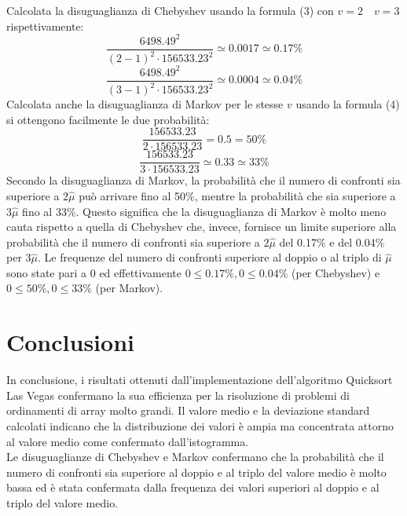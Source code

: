 \documentclass[12pt]{article}
\begin{document}
Calcolata la disuguaglianza di Chebyshev usando la formula (3)
con $v=2 \quad v=3$ rispettivamente:
\begin{equation*}
    \frac{6498.49^{2}}{(2-1)^{2}\cdot 156533.23^{2}} \simeq 0.0017 
    \simeq 0.17\%
\end{equation*}
\begin{equation*}
    \frac{6498.49^{2}}{(3-1)^{2}\cdot 156533.23^{2}} \simeq 0.0004 
    \simeq 0.04\%
\end{equation*}
Calcolata anche la disuguaglianza di Markov per le stesse $v$ usando la
formula (4) si ottengono facilmente le due probabilità:
\begin{equation*}
    \frac{156533.23}{2\cdot 156533.23} = 0.5 = 50\%
\end{equation*}
\begin{equation*}
    \frac{156533.23}{3\cdot 156533.23} \simeq 0.33 \simeq 33\%
\end{equation*}
Secondo la disuguaglianza di Markov, la probabilità che il numero di 
confronti sia superiore a $2\hat{\mu}$ può arrivare fino al 50\%, mentre 
la probabilità che sia superiore a $3\hat{\mu}$ fino al 33\%. Questo 
significa che la disuguaglianza di Markov è molto meno cauta rispetto a 
quella di Chebyshev che, invece, fornisce un limite superiore alla 
probabilità che il numero di confronti sia superiore a $2\hat{\mu}$ del 
0.17\% e del 0.04\% per $3\hat{\mu}$.
Le frequenze del numero di confronti superiore al doppio o al triplo di 
$\hat{\mu}$ sono state pari a 0 ed effettivamente 
$0\leq 0.17\%,0\leq 0.04\%$ (per Chebyshev) e $0\leq 50\%,0\leq 33\%$ 
(per Markov).
\section{Conclusioni}
In conclusione, i risultati ottenuti dall'implementazione dell'algoritmo 
Quicksort Las Vegas confermano la sua efficienza per la risoluzione di
problemi di ordinamenti di array molto grandi. Il valore medio e la 
deviazione standard calcolati indicano che la distribuzione dei valori
è ampia ma concentrata attorno al valore medio come confermato 
dall'istogramma.\\
Le disuguaglianze di Chebyshev e Markov confermano che la probabilità
che il numero di confronti sia superiore al doppio e al triplo del valore 
medio è molto bassa ed è stata confermata dalla frequenza dei valori
superiori al doppio e al triplo del valore medio.
\end{document}
